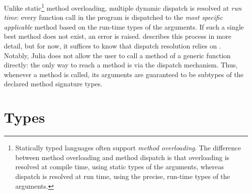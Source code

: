 Unlike static\footnote{Statically typed languages often support
\emph{method overloading}. The difference between method overloading and method
dispatch is that overloading is resolved at compile time, using static types of
the arguments, whereas dispatch is resolved at run time, using the precise,
run-time types of the arguments.} method overloading,
multiple dynamic dispatch is resolved at \emph{run time}:
every function call in the program is dispatched to the
\emph{most specific applicable} method based on the run-time
types of the arguments. If such a single best method does not exist,
an error is raised.
 describes this process in more detail, but for now,
it suffices to know that dispatch resolution relies on .
Notably, Julia does not allow the user to call a method of a generic function
directly: the only way to reach a method is via the dispatch mechanism.
Thus, whenever a method is called, its arguments are guaranteed to be
subtypes of the declared method signature types.

\section{Types}\label{sec:background:types-overview}

